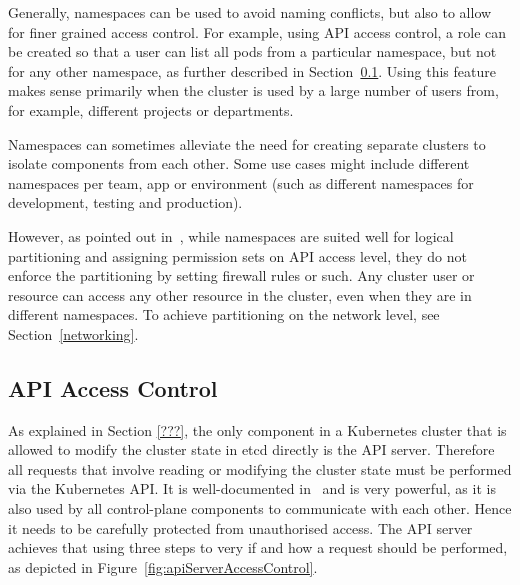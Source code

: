 Generally, namespaces can be used to avoid naming conflicts, but also to allow for finer grained access control. For example, using API access control, a role can be created so that a user can list all pods from a particular namespace, but not for any other namespace, as further described in Section~\ref{sec:apiAccessControl}. Using this feature makes sense primarily when the cluster is used by a large number of users from, for example, different projects or departments. 

Namespaces can sometimes alleviate the need for creating separate clusters to isolate components from each other. Some use cases might include different namespaces per team, app or environment (such as different namespaces for development, testing and production). 

However, as pointed out in~\textcite{namespacesInsights}, while namespaces are suited well for logical partitioning and assigning permission sets on API access level, they do not enforce the partitioning by setting firewall rules or such. Any cluster user or resource can access any other resource in the cluster, even when they are in different namespaces. To achieve partitioning on the network level, see Section~\ref{networking}.

\subsection{API Access Control} \label{sec:apiAccessControl}

As explained in Section \ref{???}, the only component in a Kubernetes cluster that is allowed to modify the cluster state in etcd directly is the API server. Therefore all requests that involve reading or modifying the cluster state must be performed via the Kubernetes API. It is well-documented in~\textcite{k8sdocsApi} and is very powerful, as it is also used by all control-plane components to communicate with each other. Hence it needs to be carefully protected from unauthorised access. The API server achieves that using three steps to very if and how a request should be performed, as depicted in Figure~\ref{fig:apiServerAccessControl}.


